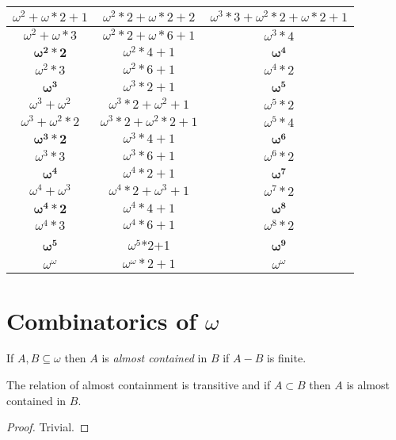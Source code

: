 \documentclass[oneside,12pt]{amsart}
\begin{document}
\begin{tabular}{|c|c|c|}
$\omega^2 + \omega*2 + 1$ & $\omega^2*2+\omega*2 + 2$ & $\omega^3 * 3 + \omega^2*2+\omega*2 + 1$ \\ \hline \hline

$\omega^2  + \omega * 3$ & $\omega^2*2+ \omega*6 + 1$ & $\omega^3 * 4$ \\ \hline \hline

$\boldsymbol{\omega^2  *2}$ & $\omega^2*4+  1$ & $\boldsymbol{\omega^4}$ \\ \hline \hline
$\omega^2  *3$ & $\omega^2*6+  1$ & $\omega^4*2$ \\ \hline \hline
$\boldsymbol{\omega^3}$ & $\omega^3*2+  1$ & $\boldsymbol{\omega^5}$ \\ \hline \hline
$\omega^3 + \omega^2$ & $\omega^3 *2+ \omega^2 + 1$ & $\omega^5*2$ \\ \hline \hline
$\omega^3 + \omega^2*2$ & $\omega^3*2 + \omega^2*2 + 1$ & $\omega^5*4$ \\ \hline \hline
$\boldsymbol{\omega^3*2}$ & $\omega^3*4+1$ & $\boldsymbol{\omega^6}$ \\ \hline \hline
$\omega^3*3$ & $\omega^3*6+1$ & $\omega^6*2$ \\ \hline \hline
$\boldsymbol{\omega^4}$ & $\omega^4*2+1$ & $\boldsymbol{\omega^7}$ \\ \hline \hline
$\omega^4 + \omega^3$ & $\omega^4*2 + \omega^3 + 1$ & $\omega^7*2$ \\ \hline \hline
$\boldsymbol{\omega^4*2}$ & $\omega^4*4+1$ & $\boldsymbol{\omega^8}$ \\ \hline \hline
$\omega^4*3$ & $\omega^4*6+1$ & $\omega^8*2$ \\ \hline \hline
$\boldsymbol{\omega^5}$ &  $\omega^5$*2+1 & $\boldsymbol{\omega^9}$ \\ \hline \hline
$\omega^{\omega}$ & $\omega^{\omega}*2 + 1$ & $\omega^{\omega}$ \\ \hline \hline

\end{tabular}

\section{Combinatorics of $\omega$}
\begin{definition}
If $A,B \subseteq \omega$ then $A$ is  \emph{almost contained} in $B$ if
$A - B$ is finite.
\end{definition}

\begin{lemma}
The relation of almost containment is transitive and if $A\subset B$ then
$A$ is almost contained in $B$.
\end{lemma}
\begin{proof}
Trivial.
\end{proof}
\end{document}
